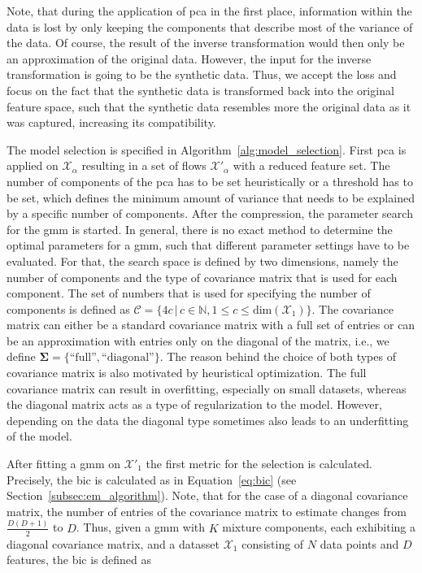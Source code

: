 \documentclass[../../main.tex]{subfiles}
\begin{document}
 Note, that during the application of \gls{pca} in the first place, information within the data is lost by only keeping the components that describe most of the variance of the data. Of course, the result of the inverse transformation would then only be an approximation of the original data. However, the input for the inverse transformation is going to be the synthetic data. Thus, we accept the loss and focus on the fact that the synthetic data is transformed back into the original feature space, such that the synthetic data resembles more the original data as it was captured, increasing its compatibility.
 
 The model selection is specified in Algorithm~\ref{alg:model_selection}. First \gls{pca} is applied on $\mathcal{X}_\alpha$ resulting in a set of flows $\mathcal{X}'_\alpha$ with a reduced feature set. The number of components of the \gls{pca} has to be set heuristically or a threshold has to be set, which defines the minimum amount of variance that needs to be explained by a specific number of components. After the compression, the parameter search for the \gls{gmm} is started. In general, there is no exact method to determine the optimal parameters for a \gls{gmm}, such that different parameter settings have to be evaluated. For that, the search space is defined by two dimensions, namely the number of components and the type of covariance matrix that is used for each component. The set of numbers that is used for specifying the number of components is defined as $\mathcal{C} = \{ 4c \, | \,  c\in \mathbb{N}, 1 \leq c \leq \text{dim}(\mathcal{X}_1) \}$. The covariance matrix can either be a standard covariance matrix with a full set of entries or can be an approximation with entries only on the diagonal of the matrix, i.e., we define $\bm{\Sigma} = \{\text{``full''}, \text{``diagonal''}\}$. The reason behind the choice of both types of covariance matrix is also motivated by heuristical optimization. The full covariance matrix can result in overfitting, especially on small datasets, whereas the diagonal matrix acts as a type of regularization to the model. However, depending on the data the diagonal type sometimes also leads to an underfitting of the model.

 After fitting a \gls{gmm} on $\mathcal{X}'_1$ the first metric for the selection is calculated. Precisely, the \gls{bic} is calculated as in Equation~\ref{eq:bic} (see Section~\ref{subsec:em_algorithm}). Note, that for the case of a diagonal covariance matrix, the number of entries of the covariance matrix to estimate changes from $\frac{D(D+1)}{2}$ to $D$. Thus, given a \gls{gmm} with $K$ mixture components, each exhibiting a diagonal covariance matrix, and a datasset $\mathcal{X}_1$ consisting of $N$ data points and $D$ features, the \gls{bic} is defined as
\end{document}
